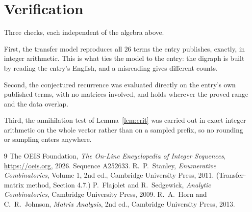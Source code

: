 \documentclass[11pt,a4paper]{article}
\theoremstyle{plain}
\theoremstyle{definition}
\begin{document}
\section{Verification}

Three checks, each independent of the algebra above.

First, the transfer model reproduces all $26$ terms the entry publishes, exactly, in
integer arithmetic. This is what ties the model to the entry: the digraph is built by reading
the entry's English, and a misreading gives different counts.

Second, the conjectured recurrence was evaluated directly on the entry's own published terms,
with no matrices involved, and holds wherever the proved range and the data overlap.

Third, the annihilation test of Lemma~\ref{lem:crit} was carried out in exact integer
arithmetic on the whole vector rather than on a sampled prefix, so no rounding or sampling
enters anywhere.

\begin{thebibliography}{9}
 The OEIS Foundation, \emph{The On-Line Encyclopedia of Integer
Sequences}, \url{https://oeis.org}, 2026. Sequence A252633.
 R.~P.~Stanley, \emph{Enumerative Combinatorics}, Volume 1, 2nd ed.,
Cambridge University Press, 2011. (Transfer-matrix method, Section 4.7.)
 P.~Flajolet and R.~Sedgewick, \emph{Analytic Combinatorics}, Cambridge
University Press, 2009.
 R.~A.~Horn and C.~R.~Johnson, \emph{Matrix Analysis}, 2nd ed., Cambridge
University Press, 2013.
\end{thebibliography}
\end{document}
